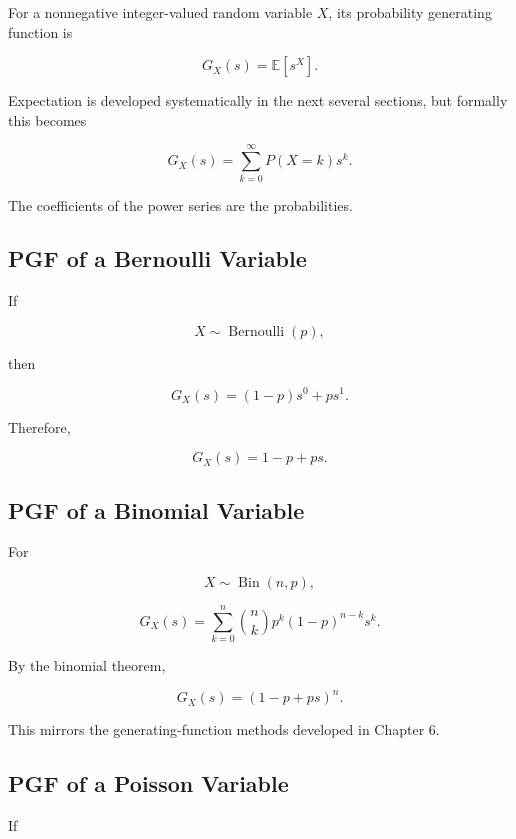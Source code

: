For a nonnegative integer-valued random variable \(X\), its probability
generating function is

\[
\boxed{
G_X(s)
=
\mathbb{E}[s^X].
}
\]

Expectation is developed systematically in the next several sections,
but formally this becomes

\[
\boxed{
G_X(s)
=
\sum_{k=0}^{\infty}
P(X=k)s^k.
}
\]

The coefficients of the power series are the probabilities.

\subsection{PGF of a Bernoulli Variable}
\label{subsec:bernoulli-pgf}

If

\[
X\sim\operatorname{Bernoulli}(p),
\]

then

\[
G_X(s)
=
(1-p)s^0+ps^1.
\]

Therefore,

\[
\boxed{
G_X(s)
=
1-p+ps.
}
\]

\subsection{PGF of a Binomial Variable}
\label{subsec:binomial-pgf}

For

\[
X\sim\operatorname{Bin}(n,p),
\]

\[
G_X(s)
=
\sum_{k=0}^{n}
\binom nk
p^k(1-p)^{n-k}s^k.
\]

By the binomial theorem,

\[
\boxed{
G_X(s)
=
(1-p+ps)^n.
}
\]

This mirrors the generating-function methods developed in Chapter 6.

\subsection{PGF of a Poisson Variable}
\label{subsec:poisson-pgf}

If

